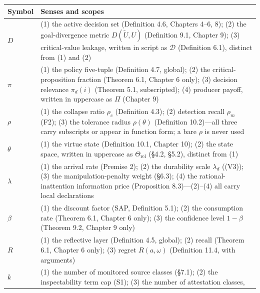 \documentclass[
  11pt]{article}
\begin{document}
\begin{longtable}[]{@{}
  >{\raggedright\arraybackslash}p{}
  >{\raggedright\arraybackslash}p{}@{}}
\toprule\noalign{}
\begin{minipage}[b]{\linewidth}\raggedright
Symbol
\end{minipage} & \begin{minipage}[b]{\linewidth}\raggedright
Senses and scopes
\end{minipage} \\
\midrule\noalign{}
\endhead
\bottomrule\noalign{}
\endlastfoot
\(D\) & (1) the active decision set (Definition 4.6, Chapters 4--6, 8);
(2) the goal-divergence metric \(D(\tilde U, U)\) (Definition 9.1,
Chapter 9); (3) critical-value leakage, written in script as
\(\mathcal{D}\) (Definition 6.1), distinct from (1) and (2) \\
\(\pi\) & (1) the policy five-tuple (Definition 4.7, global); (2) the
critical-proposition fraction (Theorem 6.1, Chapter 6 only); (3)
decision relevance \(\pi_d(i)\) (Theorem 5.1, subscripted); (4) producer
payoff, written in uppercase as \(\Pi\) (Chapter 9) \\
\(\rho\) & (1) the collapse ratio \(\rho_c\) (Definition 4.3); (2)
detection recall \(\rho_m\) (F2); (3) the tolerance radius
\(\rho(\theta)\) (Definition 10.2)---all three carry subscripts or
appear in function form; a bare \(\rho\) is never used \\
\(\theta\) & (1) the virtue state (Definition 10.1, Chapter 10); (2) the
state space, written in uppercase as \(\Theta_{\mathrm{rel}}\) (§4.2,
§5.2), distinct from (1) \\
\(\lambda\) & (1) the arrival rate (Premise 2); (2) the durability scale
\(\lambda_d\) ((V3)); (3) the manipulation-penalty weight (§6.3); (4)
the rational-inattention information price (Proposition 8.3)---(2)--(4)
all carry local declarations \\
\(\beta\) & (1) the discount factor (SAP, Definition 5.1); (2) the
consumption rate (Theorem 6.1, Chapter 6 only); (3) the confidence level
\(1-\beta\) (Theorem 9.2, Chapter 9 only) \\
\(R\) & (1) the reflective layer (Definition 4.5, global); (2) recall
(Theorem 6.1, Chapter 6 only); (3) regret \(R(a,\omega)\) (Definition
11.4, with arguments) \\
\(k\) & (1) the number of monitored source classes (§7.1); (2) the
inspectability term cap (S1); (3) the number of attestation classes,

\end{longtable}
\end{document}
